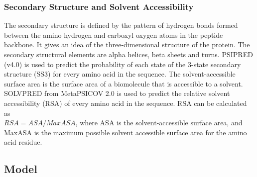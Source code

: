 \documentclass[journal=jacsat,manuscript=article]{achemso}
\begin{document}
\subsubsection{Secondary Structure and Solvent Accessibility}
\quad The secondary structure is defined by the pattern of hydrogen bonds formed between the amino hydrogen and carboxyl oxygen atoms in the peptide backbone. It gives an idea of the three-dimensional structure of the protein. The secondary structural elements are alpha helices, beta sheets and turns. PSIPRED (v4.0) \cite{jones1999protein} is used to predict the probability of each state of the 3-state secondary structure (SS3) for every amino acid in the sequence. The solvent-accessible surface area is the surface area of a biomolecule that is accessible to a solvent. SOLVPRED from MetaPSICOV 2.0\cite{jones2015metapsicov} is used to predict the relative solvent accessibility (RSA) of every amino acid in the sequence. RSA can be calculated as \\ ${RSA} = {ASA} / {MaxASA}$, where ASA is the solvent-accessible surface area, and MaxASA is the maximum possible solvent accessible surface area for the amino acid residue.





\subsection{Model}
\end{document}
